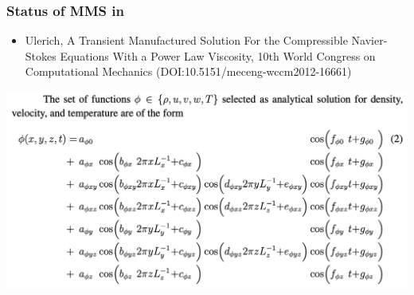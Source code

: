 \begin{frame}\frametitle{Status of MMS in \mirgecom{}}
\begin{itemize}
\item Ulerich, A Transient Manufactured Solution For the Compressible Navier-Stokes Equations With a Power Law Viscosity, 10th World Congress on Computational Mechanics (DOI:10.5151/meceng-wccm2012-16661)
\end{itemize}
\includegraphics[width=\textwidth]{figures/MoserIISoln.png}
\end{frame}



